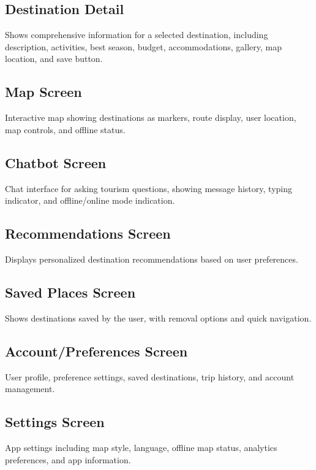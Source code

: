 \documentclass[12pt,a4paper,oneside]{report}
\begin{document}
\subsection{Destination Detail}

Shows comprehensive information for a selected destination, including description, activities, best season, budget, accommodations, gallery, map location, and save button.

\subsection{Map Screen}

Interactive map showing destinations as markers, route display, user location, map controls, and offline status.

\subsection{Chatbot Screen}

Chat interface for asking tourism questions, showing message history, typing indicator, and offline/online mode indication.

\subsection{Recommendations Screen}

Displays personalized destination recommendations based on user preferences.

\subsection{Saved Places Screen}

Shows destinations saved by the user, with removal options and quick navigation.

\subsection{Account/Preferences Screen}

User profile, preference settings, saved destinations, trip history, and account management.

\subsection{Settings Screen}

App settings including map style, language, offline map status, analytics preferences, and app information.
\end{document}
